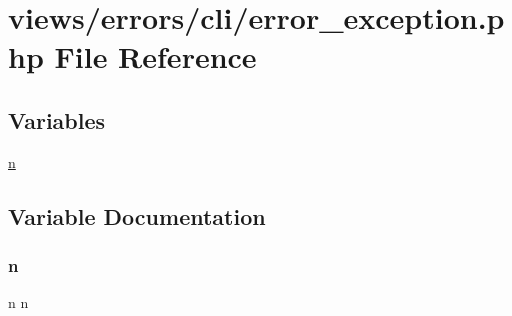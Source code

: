 \hypertarget{cli_2error__exception_8php}{}\section{views/errors/cli/error\+\_\+exception.php File Reference}
\label{cli_2error__exception_8php}
\subsection*{Variables}
\begin{DoxyCompactItemize}
\item 
\mbox{\hyperlink{cli_2error__exception_8php_a2e6b16bbc42094e4c51ade3c10afdcf1}{n}}
\end{DoxyCompactItemize}


\subsection{Variable Documentation}
\mbox{\label{cli_2error__exception_8php_a2e6b16bbc42094e4c51ade3c10afdcf1}} 
\subsubsection{\texorpdfstring{n}{n}}
{\footnotesize\ttfamily n n}

